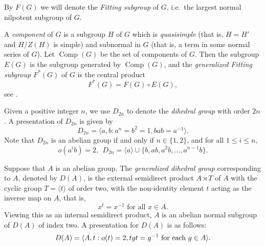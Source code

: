 \documentclass{elsarticle}
\newcommand{\Comp}{\mathop{\mathrm{Comp}}}
\begin{document}
By $F(G)$ we will denote the {\it Fitting subgroup} of $G$, i.e.\ the largest normal nilpotent subgroup of $G$.

A \emph{component} of $G$ is a subgroup $H$ of $G$ which is \emph{quasisimple}
(that is, $H=H'$ and $H/Z(H)$ is simple) and subnormal in $G$ (that is, a term
in some normal series of $G$). Let $\Comp(G)$ be the set of components of $G$.
Then the subgroup $E(G)$ is the subgroup generated by $\Comp(G)$, and the
\emph{generalized Fitting subgroup} $F^*(G)$ of $G$ is the central product
\begin{equation}\label{F(G)E(G)} F^*(G)=F(G) \circ E(G), \end{equation}
see \cite[31.12]{Asch86}.

Given a positive integer $n$, we use $D_{2n}$ to denote the {\em
  dihedral group} with order $2n$. A presentation of $D_{2n}$ is given
by
\begin{equation}\label{d2n}
D_{2n}=\langle a,b: a^n=b^2=1, bab=a^{-1}\rangle.
\end{equation}
Note that $D_{2n}$ is an abelian group if and only if $n\in \{1,2\}$, and for all $1\le i \le n$,
\begin{equation}\label{d2n-1}
o(a^ib)=2,~~
D_{2n}=\langle a\rangle \cup \{b,ab,a^2b,\ldots,a^{n-1}b\}.
\end{equation}

Suppose that $A$ is an abelian group. The {\em generalized dihedral
  group} corresponding to $A$, denoted by $D(A)$, is the external
semidirect product $A\rtimes T$ of $A$ with the cyclic group
$T=\langle t \rangle$ of order two, with the non-identity element $t$
acting as the inverse map on $A$, that is,
\[
x^t=x^{-1} \textrm{ for all } x\in A.
\]
Viewing this as an internal semidirect
product, $A$ is an abelian normal subgroup of $D(A)$ of index two. A
presentation for $D(A)$ is as follows:
\begin{equation}\label{gdg}
D(A)=\langle A,t: o(t)=2, tgt=g^{-1}\hbox{ for each $g\in A$}\rangle.
\end{equation}
\end{document}
